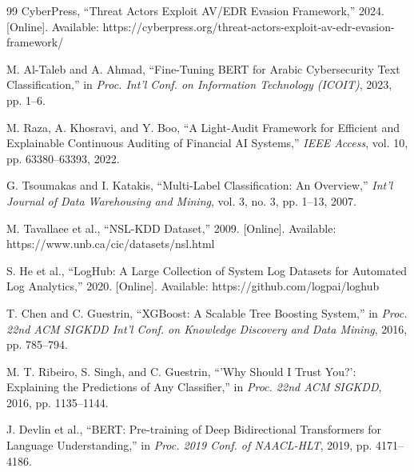 \documentclass[11pt,conference]{IEEEtran}
\begin{document}
\begin{thebibliography}{99}
CyberPress, ``Threat Actors Exploit AV/EDR Evasion Framework,'' 2024. [Online]. Available: https://cyberpress.org/threat-actors-exploit-av-edr-evasion-framework/

M. Al-Taleb and A. Ahmad, ``Fine-Tuning BERT for Arabic Cybersecurity Text Classification,'' in \textit{Proc. Int'l Conf. on Information Technology (ICOIT)}, 2023, pp. 1--6.

M. Raza, A. Khosravi, and Y. Boo, ``A Light-Audit Framework for Efficient and Explainable Continuous Auditing of Financial AI Systems,'' \textit{IEEE Access}, vol. 10, pp. 63380--63393, 2022.

G. Tsoumakas and I. Katakis, ``Multi-Label Classification: An Overview,'' \textit{Int'l Journal of Data Warehousing and Mining}, vol. 3, no. 3, pp. 1--13, 2007.

M. Tavallaee et al., ``NSL-KDD Dataset,'' 2009. [Online]. Available: https://www.unb.ca/cic/datasets/nsl.html

S. He et al., ``LogHub: A Large Collection of System Log Datasets for Automated Log Analytics,'' 2020. [Online]. Available: https://github.com/logpai/loghub

T. Chen and C. Guestrin, ``XGBoost: A Scalable Tree Boosting System,'' in \textit{Proc. 22nd ACM SIGKDD Int'l Conf. on Knowledge Discovery and Data Mining}, 2016, pp. 785--794.

M. T. Ribeiro, S. Singh, and C. Guestrin, ``'Why Should I Trust You?': Explaining the Predictions of Any Classifier,'' in \textit{Proc. 22nd ACM SIGKDD}, 2016, pp. 1135--1144.

J. Devlin et al., ``BERT: Pre-training of Deep Bidirectional Transformers for Language Understanding,'' in \textit{Proc. 2019 Conf. of NAACL-HLT}, 2019, pp. 4171--4186.

\end{thebibliography}

\balance
\end{document}

